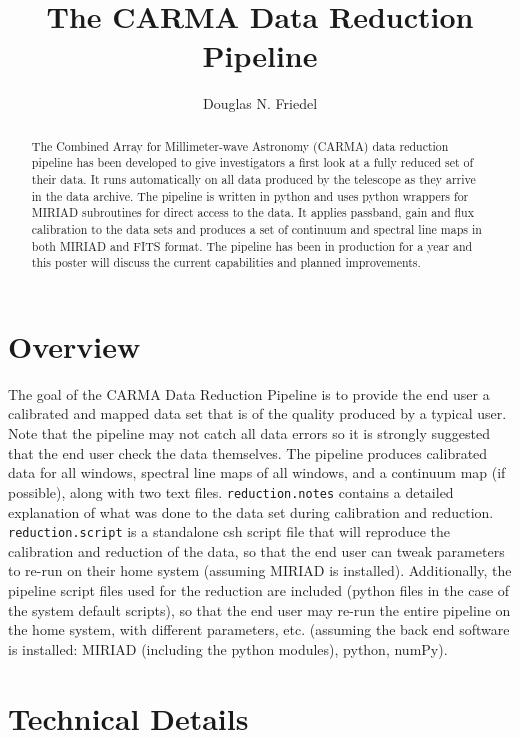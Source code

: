
\resetcounters


\title{The CARMA Data Reduction Pipeline}
\author{Douglas N. Friedel}


\begin{abstract}
The Combined Array for Millimeter-wave Astronomy (CARMA) data reduction pipeline has been developed to give investigators a first look at a fully reduced set of their data. It runs automatically on all data produced by the telescope as they arrive in the data archive. The pipeline is written in python and uses python wrappers for MIRIAD subroutines for direct access to the data. It applies passband, gain and flux calibration to the data sets and produces a set of continuum and spectral line maps in both MIRIAD and FITS format. The pipeline has been in production for a year and this poster will discuss the current capabilities and planned improvements.
\end{abstract}

\section{Overview}

The goal of the CARMA Data Reduction Pipeline is to provide the end user a calibrated and mapped data set that is of the quality produced by a typical user. Note that the pipeline may not catch all data errors so it is strongly suggested that the end user check the data themselves. The pipeline produces calibrated data for all windows, spectral line maps of all windows, and a continuum map (if possible), along with two text files. \verb#reduction.notes# contains a detailed explanation of what was done to the data set during calibration and reduction. \verb#reduction.script# is a standalone csh script file that will reproduce the calibration and reduction of the data, so that the end user can tweak parameters to re-run on their home system (assuming MIRIAD is installed). Additionally, the pipeline script files used for the reduction are included (python files in the case of the system default scripts), so that the end user may re-run the entire pipeline on the home system, with different parameters, etc. (assuming the back end software is installed: MIRIAD (including the python modules), python, numPy).

\section{Technical Details}

